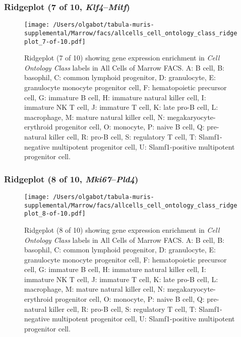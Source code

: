 \subsubsection{Ridgeplot (7 of 10, \emph{Klf4}--\emph{Mitf})}
\begin{figure}[h]
\centering
\texttt{[image: /Users/olgabot/tabula-muris-supplemental/Marrow/facs/allcells\_cell\_ontology\_class\_ridgeplot\_7-of-10.pdf]}

\caption{ Ridgeplot (7 of 10)  showing gene expression enrichment in \emph{Cell Ontology Class} labels in All Cells of Marrow FACS. A: B cell, B: basophil, C: common lymphoid progenitor, D: granulocyte, E: granulocyte monocyte progenitor cell, F: hematopoietic precursor cell, G: immature B cell, H: immature natural killer cell, I: immature NK T cell, J: immature T cell, K: late pro-B cell, L: macrophage, M: mature natural killer cell, N: megakaryocyte-erythroid progenitor cell, O: monocyte, P: naive B cell, Q: pre-natural killer cell, R: pro-B cell, S: regulatory T cell, T: Slamf1-negative multipotent progenitor cell, U: Slamf1-positive multipotent progenitor cell.}
\end{figure}


\clearpage

\subsubsection{Ridgeplot (8 of 10, \emph{Mki67}--\emph{Pld4})}
\begin{figure}[h]
\centering
\texttt{[image: /Users/olgabot/tabula-muris-supplemental/Marrow/facs/allcells\_cell\_ontology\_class\_ridgeplot\_8-of-10.pdf]}

\caption{ Ridgeplot (8 of 10)  showing gene expression enrichment in \emph{Cell Ontology Class} labels in All Cells of Marrow FACS. A: B cell, B: basophil, C: common lymphoid progenitor, D: granulocyte, E: granulocyte monocyte progenitor cell, F: hematopoietic precursor cell, G: immature B cell, H: immature natural killer cell, I: immature NK T cell, J: immature T cell, K: late pro-B cell, L: macrophage, M: mature natural killer cell, N: megakaryocyte-erythroid progenitor cell, O: monocyte, P: naive B cell, Q: pre-natural killer cell, R: pro-B cell, S: regulatory T cell, T: Slamf1-negative multipotent progenitor cell, U: Slamf1-positive multipotent progenitor cell.}
\end{figure}


\clearpage

